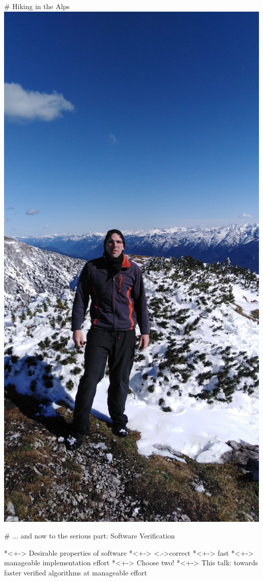 \documentclass[fleqn]{beamer}
\begin{document}
# Hiking in the Alps
  \includegraphics[height=\textheight]{hiking.jpg}


# ... and now to the serious part: Software Verification

  *<+-> Desirable properties of software
    *<+-> \onslide<.->{correct}
    *<+-> fast
    *<+-> manageable implementation effort
  *<+-> Choose two!
  *<+-> This talk: towards faster verified algorithms at manageable effort
\end{document}
